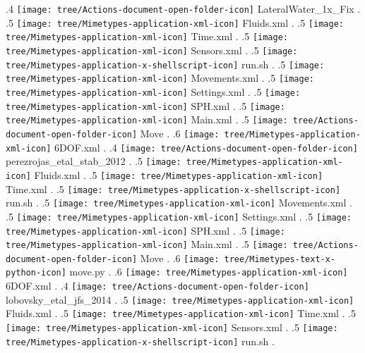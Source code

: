 {.4 { \texttt{[image: tree/Actions-document-open-folder-icon]} LateralWater\_1x\_Fix }.
.5 { \texttt{[image: tree/Mimetypes-application-xml-icon]} Fluids.xml }.
.5 { \texttt{[image: tree/Mimetypes-application-xml-icon]} Time.xml }.
.5 { \texttt{[image: tree/Mimetypes-application-xml-icon]} Sensors.xml }.
.5 { \texttt{[image: tree/Mimetypes-application-x-shellscript-icon]} run.sh }.
.5 { \texttt{[image: tree/Mimetypes-application-xml-icon]} Movements.xml }.
.5 { \texttt{[image: tree/Mimetypes-application-xml-icon]} Settings.xml }.
.5 { \texttt{[image: tree/Mimetypes-application-xml-icon]} SPH.xml }.
.5 { \texttt{[image: tree/Mimetypes-application-xml-icon]} Main.xml }.
.5 { \texttt{[image: tree/Actions-document-open-folder-icon]} Move }.
.6 { \texttt{[image: tree/Mimetypes-application-xml-icon]} 6DOF.xml }.
.4 { \texttt{[image: tree/Actions-document-open-folder-icon]} perezrojas\_etal\_stab\_2012 }.
.5 { \texttt{[image: tree/Mimetypes-application-xml-icon]} Fluids.xml }.
.5 { \texttt{[image: tree/Mimetypes-application-xml-icon]} Time.xml }.
.5 { \texttt{[image: tree/Mimetypes-application-x-shellscript-icon]} run.sh }.
.5 { \texttt{[image: tree/Mimetypes-application-xml-icon]} Movements.xml }.
.5 { \texttt{[image: tree/Mimetypes-application-xml-icon]} Settings.xml }.
.5 { \texttt{[image: tree/Mimetypes-application-xml-icon]} SPH.xml }.
.5 { \texttt{[image: tree/Mimetypes-application-xml-icon]} Main.xml }.
.5 { \texttt{[image: tree/Actions-document-open-folder-icon]} Move }.
.6 { \texttt{[image: tree/Mimetypes-text-x-python-icon]} move.py }.
.6 { \texttt{[image: tree/Mimetypes-application-xml-icon]} 6DOF.xml }.
.4 { \texttt{[image: tree/Actions-document-open-folder-icon]} lobovsky\_etal\_jfs\_2014 }.
.5 { \texttt{[image: tree/Mimetypes-application-xml-icon]} Fluids.xml }.
.5 { \texttt{[image: tree/Mimetypes-application-xml-icon]} Time.xml }.
.5 { \texttt{[image: tree/Mimetypes-application-xml-icon]} Sensors.xml }.
.5 { \texttt{[image: tree/Mimetypes-application-x-shellscript-icon]} run.sh }.
}
